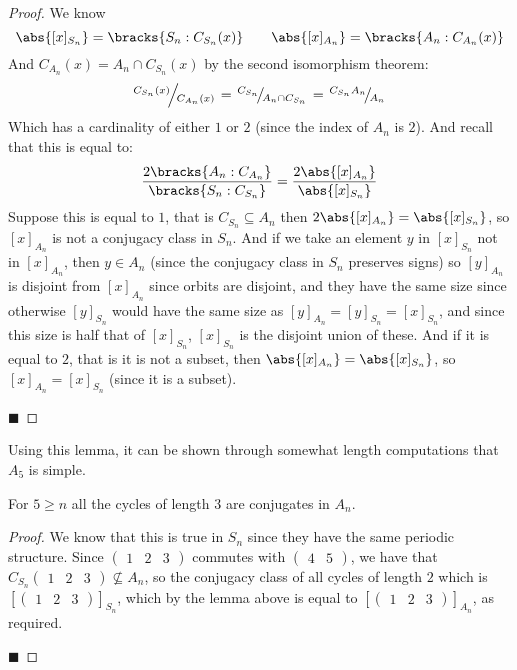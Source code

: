 \documentclass[10pt]{article}
\def\slfrac#1#2{\left.{}^{#1}\mkern-4mu\middle/\mkern-3mu{}_{#2}\right.}
\def\pmat#1{\begin{pmatrix} #1 \end{pmatrix}}
\begin{document}
\begin{proof}

    We know
    \[ \abs{[x]_{S_n}}=\bracks{S_n: C_{S_n}(x)} \qquad \abs{[x]_{A_n}}=\bracks{A_n:C_{A_n}(x)} \]
    And $C_{A_n}(x)=A_n\cap C_{S_n}(x)$ by the second isomorphism theorem:
    \[ \slfrac{C_{S_n}(x)}{C_{A_n}(x)} = \slfrac{C_{S_n}}{A_n\cap C_{S_n}} = \slfrac{C_{S_n}A_n}{A_n} \]
    Which has a cardinality of either $1$ or $2$ (since the index of $A_n$ is $2$).
    And recall that this is equal to:
    \[ \frac{2\bracks{A_n:C_{A_n}}}{\bracks{S_n:C_{S_n}}} = \frac{2\abs{[x]_{A_n}}}{\abs{[x]_{S_n}}} \]
    Suppose this is equal to $1$, that is $C_{S_n}\subseteq A_n$ then $2\abs{[x]_{A_n}}=\abs{[x]_{S_n}}$, so $[x]_{A_n}$ is not a conjugacy class in $S_n$.
    And if we take an element $y$ in $[x]_{S_n}$ not in $[x]_{A_n}$, then $y\in A_n$ (since the conjugacy class in $S_n$ preserves signs) so $[y]_{A_n}$ is disjoint from $[x]_{A_n}$ since orbits are
    disjoint, and they have the same size since otherwise $[y]_{S_n}$ would have the same size as $[y]_{A_n}=[y]_{S_n}=[x]_{S_n}$, and since this size is half that of $[x]_{S_n}$, $[x]_{S_n}$ is the
    disjoint union of these.
    And if it is equal to $2$, that is it is not a subset, then $\abs{[x]_{A_n}}=\abs{[x]_{S_n}}$, so $[x]_{A_n}=[x]_{S_n}$ (since it is a subset).

    \hfill$\blacksquare$

\end{proof}

Using this lemma, it can be shown through somewhat length computations that $A_5$ is simple.

\begin{lemm*}

    For $5\geq n$ all the cycles of length $3$ are conjugates in $A_n$.

\end{lemm*}

\begin{proof}

    We know that this is true in $S_n$ since they have the same periodic structure.
    Since $\pmat{1 & 2 & 3}$ commutes with $\pmat{4 & 5}$, we have that $C_{S_n}\pmat{1 & 2 & 3}\not\subseteq A_n$, so the conjugacy class of all cycles of length $2$ which is $[\pmat{1&2&3}]_{S_n}$, which
    by the lemma above is equal to $[\pmat{1&2&3}]_{A_n}$, as required.

    \hfill$\blacksquare$

\end{proof}
\end{document}
